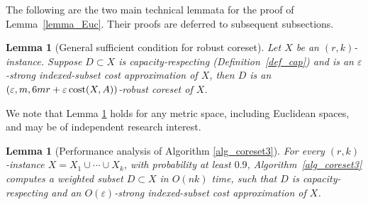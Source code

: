 \documentclass[11pt,letterpaper]{article}
\newtheorem{lemma}[theorem]{Lemma}
\theoremstyle{definition}
\newcommand{\eps}{\varepsilon}
\begin{document}

The following are the two main technical lemmata for the proof of Lemma~\ref{lemma_Euc}. Their proofs are deferred to subsequent subsections.


\begin{lemma}[General sufficient condition for robust coreset]
\label{lem_euc_coreset_guarantee}
Let $X$ be an $(r,k)$-instance. Suppose $D\subset X$ is capacity-respecting (Definition~\ref{def_cap}) and is an $\eps$-strong indexed-subset cost approximation of $X$, then $D$ is an $(\eps,m,6mr + \eps\cost(X,A))$-robust coreset of $X$.
\end{lemma}

We note that Lemma \ref{lem_euc_coreset_guarantee} holds for any metric space, including Euclidean spaces, and may be of independent research interest.
%

\begin{lemma}[Performance analysis of Algorithm \ref{alg_coreset3}]
\label{lemma_Euc_tech}
    For every $(r,k)$-instance $X=X_1\cup\cdots\cup X_k$, with probability at least $0.9$, Algorithm~\ref{alg_coreset3} computes a weighted subset $D\subset X$ in $O(nk)$ time, such that $D$ is capacity-respecting and an $O(\eps)$-strong indexed-subset cost approximation of $X$.
\end{lemma}
\end{document}
